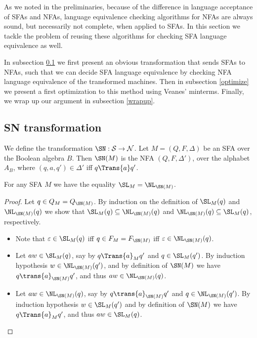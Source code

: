 As we noted in the preliminaries, because of the difference in language acceptance of SFAs and NFAs, language equivalence checking algorithms for NFAs are always sound, but necessarily not complete, when applied to SFAs. In this section we tackle the problem of reusing these algorithms for checking SFA language equivalence as well.

In subsection \ref{transform} we first present an obvious transformation that sends SFAs to NFAs, such that we can decide SFA language equivalence by checking NFA language equivalence of the transformed machines. Then in subsection \ref{optimize} we present a first optimization to this method using Veanes' minterms. Finally, we wrap up our argument in subsection \ref{wrapup}.

\subsection{SN transformation}
\label{transform}

\begin{definition}[SN Transformation]
\label{sn}
We define the transformation $\SN : \mathcal{S} \to \mathcal{N}$. Let $M = (Q, F, \Delta)$ be an SFA over the Boolean algebra $B$. Then $\SN(M)$ is the NFA $(Q, F, \Delta')$, over the alphabet $A_B$, where $(q,a,q') \in \Delta'$ iff $q \Trans{a} q'$.
\end{definition}

\begin{lem}
\label{sn-pres}
For any SFA $M$ we have the equality $\SL_M = \NL_{\SN(M)}$.
\end{lem}
\begin{proof}
Let $q \in Q_M = Q_{\SN(M)}$. By induction on the definition of $\SL_M(q)$ and $\NL_{\SN(M)}(q)$ we show that $\SL_M(q) \subseteq \NL_{\SN(M)}(q)$ and $\NL_{\SN(M)}(q) \subseteq \SL_M(q)$, respectively.
\begin{itemize}
\item Note that $\varepsilon \in \SL_M(q)$ iff $q \in F_M = F_{\SN(M)}$ iff $\varepsilon \in \NL_{\SN(M)}(q)$.
\item Let $aw \in \SL_M(q)$, say by $q \Trans{a}_M q'$ and $q \in \SL_M(q')$. By induction hypothesis $w \in \NL_{\SN(M)}(q')$, and by definition of $\SN(M)$ we have $q \trans{a}_{\SN(M)} q'$, and thus $aw \in \NL_{\SN(M)}(q)$.
\item Let $aw \in \NL_{\SN(M)}(q)$, say by $q \trans{a}_{\SN(M)} q'$ and $q \in \NL_{\SN(M)}(q')$. By induction hypothesis $w \in \SL_M(q')$ and by definition of $\SN(M)$ we have $q \Trans{a}_M q'$, and thus $aw \in \SL_M(q)$.
\end{itemize}
\end{proof}

